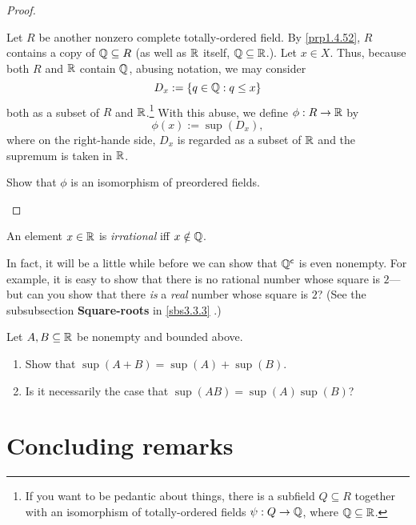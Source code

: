 \begin{thm}
\begin{proof}
\begin{savenotes}
Let $R$ be another nonzero complete totally-ordered field.  By \cref{prp1.4.52}, $R$ contains a copy of $\mathbb{Q} \subseteq R$ (as well as $\mathbb{R}$ itself, $\mathbb{Q} \subseteq \mathbb{R}$.).  Let $x\in X$.  Thus, because both $R$ and $\mathbb{R}$ contain $\mathbb{Q}$, abusing notation, we may consider
\begin{equation}
D_x:=\left\{ q\in \mathbb{Q} :q\leq x\right\}
\end{equation}
both as a subset of $R$ and $\mathbb{R}$.\footnote{If you want to be pedantic about things, there is a subfield $Q\subseteq R$ together with an isomorphism of totally-ordered fields $\psi :Q\rightarrow \mathbb{Q}$, where $\mathbb{Q} \subseteq \mathbb{R}$.}  With this abuse, we define $\phi :R\rightarrow \mathbb{R}$ by
\begin{equation}
\phi (x):=\sup (D_x),
\end{equation}
where on the right-hande side, $D_x$ is regarded as a subset of $\mathbb{R}$ and the supremum is taken in $\mathbb{R}$.
\begin{exr}
Show that $\phi$ is an isomorphism of preordered fields.
\end{exr}
\end{savenotes}
\end{proof}
\end{thm}
\begin{dfn}
An element $x\in \mathbb{R}$ is \emph{irrational} iff $x\notin \mathbb{Q}$.
\begin{rmk}
In fact, it will be a little while before we can show that $\mathbb{Q} ^{\mathsf{c}}$ is even nonempty.  For example, it is easy to show that there is no rational number whose square is $2$---but can you show that there \emph{is} a \emph{real} number whose square is $2$?  (See the subsubsection \textbf{Square-roots} in \cref{sbs3.3.3} .)
\end{rmk}
\end{dfn}

\begin{exr}
Let $A,B\subseteq \mathbb{R}$ be nonempty and bounded above.
\begin{enumerate}
\item Show that $\sup (A+B)=\sup (A)+\sup (B)$.
\item Is it necessarily the case that $\sup (AB)=\sup (A)\sup (B)$?
\end{enumerate}
\end{exr}

\section{Concluding remarks}

